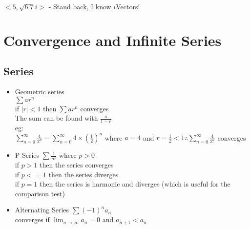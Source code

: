 \documentclass{article}
\begin{document}
\(<5,\sqrt{6.7}i>\) - Stand back, I know \(i\)Vectors!\\
\section*{Convergence and Infinite Series}
  \subsection*{Series}
  \begin{itemize}
    \item Geometric series\\
      \subitem \( \sum ar^n \) \\
      if \( |r|<1 \) then \( \sum ar^n \) converges\\
      The sum can be found with \(\frac{a}{1-r}\)\\
      \subitem eg:\\
      \( \sum\limits_{n=0}^{\infty} \frac {4} {2^n} =
      \sum\limits_{n=0}^{\infty} 4 \times (\frac {1} {2})^n \) where
      \(a=4\) and \(r=\frac {1} {2} < 1 \therefore \sum\limits_{n=0}^{\infty}
      \frac{4}{2^n} \) converges \\
    \item P-Series
      \subitem \( \sum \frac{1}{n^p}\) where
      \( p>0 \) \\
      if \(p>1\) then the series converges\\
      if \(p<=1\) then the series diverges\\
      if \(p=1\) then the series is harmonic and diverges (which is
      useful for the comparison test)\\
    \item Alternating Series
      \subitem \( \sum (-1)^n a_n \)\\
      converges if \( \lim_{n\rightarrow\infty} a_n=0 \) and \( a_{n+1}<a_n \)\\
  \end{itemize}
\end{document}
